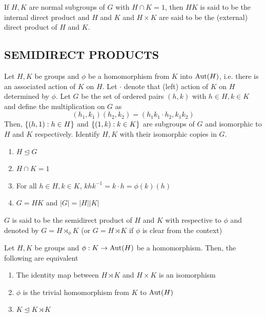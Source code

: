 \begin{definition}
	If $H, K$ are normal subgroups of $G$ with $H \cap K = 1$, then $HK$ is said to be the internal direct product and $H$ and $K$ and $H \times K$ are said to be the (external) direct product of $H$ and $K$.
\end{definition}

\subsection{SEMIDIRECT PRODUCTS}

\begin{definition}
	Let $H, K$ be groups and $\phi$ be a homomorphism from $K$ into $\operatorname{Aut}(H)$, i.e. there is an associated action of $K$ on $H$. Let $\cdot$ denote that (left) action of $K$ on $H$ determined by $\phi$. Let $G$ be the set of ordered pairs $(h, k)$ with $h \in H, k \in K$ and define the multiplication on $G$ as
	\[
	(h_1, k_1) (h_2, k_2) = (h_1 k_1 \cdot h_2, k_1 k_2)
	\]
	Then, $\{(h, 1): h \in H\}$ and $\{(1, k): k \in K\}$ are subgroups of $G$ and isomorphic to $H$ and $K$ respectively. Identify $H, K$ with their isomorphic copies in $G$.
	\begin{enumerate}
		\item $H \trianglelefteq G$
		\item $H \cap K = 1$
		\item For all $h \in H, k \in K$, $khk^{-1} = k \cdot h = \phi(k)(h)$
		\item $G = HK$ and $|G| = |H||K|$
	\end{enumerate}
	
	$G$ is said to be the semidirect product of $H$ and $K$ with respective to $\phi$ and denoted by $G = H \rtimes_\phi K$ (or $G = H \rtimes K$ if $\phi$ is clear from the context)
\end{definition}

\begin{proposition}
	Let $H, K$ be groups and $\phi: K \to \operatorname{Aut}(H)$ be a homomorphism. Then, the following are equivalent
	\begin{enumerate}
		\item The identity map between $H \rtimes K$ and $H \times K$ is an isomorphism
		\item $\phi$ is the trivial homomorphism from $K$ to $\operatorname{Aut}(H)$
		\item $K \trianglelefteq K \rtimes K$
	\end{enumerate}
\end{proposition}

